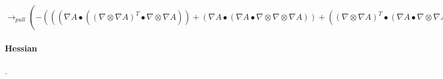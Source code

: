 \documentclass{article}
\begin{document}
\newline $\rightarrow_{pull}(-((( \nabla A \bullet (( \nabla  \otimes  \nabla A)^T \bullet  \nabla  \otimes  \nabla A))+( \nabla A \bullet ( \nabla A \bullet  \nabla  \otimes  \nabla  \otimes  \nabla A))+(( \nabla  \otimes  \nabla A)^T \bullet ( \nabla A \bullet  \nabla  \otimes  \nabla A))))* \frac{1}{( \nabla A \bullet  \nabla A)}+(2*( \nabla A \bullet ( \nabla A \bullet  \nabla  \otimes  \nabla A))*( \nabla A \bullet  \nabla  \otimes  \nabla A))* \frac{1}{((( \nabla A \bullet  \nabla A))^2)})$






\paragraph{Hessian}.\\
\end{document}
